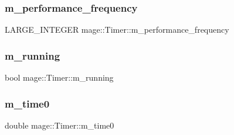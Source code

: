 \subsubsection{\texorpdfstring{m\+\_\+performance\+\_\+frequency}{m\_performance\_frequency}}
{\footnotesize\ttfamily L\+A\+R\+G\+E\+\_\+\+I\+N\+T\+E\+G\+ER mage\+::\+Timer\+::m\+\_\+performance\+\_\+frequency\hspace{0.3cm}{\ttfamily [private]}}

\hypertarget{classmage_1_1_timer_ac8d975843e5b2199848284de910d3291}{}\label{classmage_1_1_timer_ac8d975843e5b2199848284de910d3291} 
\subsubsection{\texorpdfstring{m\+\_\+running}{m\_running}}
{\footnotesize\ttfamily bool mage\+::\+Timer\+::m\+\_\+running\hspace{0.3cm}{\ttfamily [private]}}

\hypertarget{classmage_1_1_timer_a73fa08d14bfa273f158f967a8e58f96f}{}\label{classmage_1_1_timer_a73fa08d14bfa273f158f967a8e58f96f} 
\subsubsection{\texorpdfstring{m\+\_\+time0}{m\_time0}}
{\footnotesize\ttfamily double mage\+::\+Timer\+::m\+\_\+time0\hspace{0.3cm}{\ttfamily [private]}}

